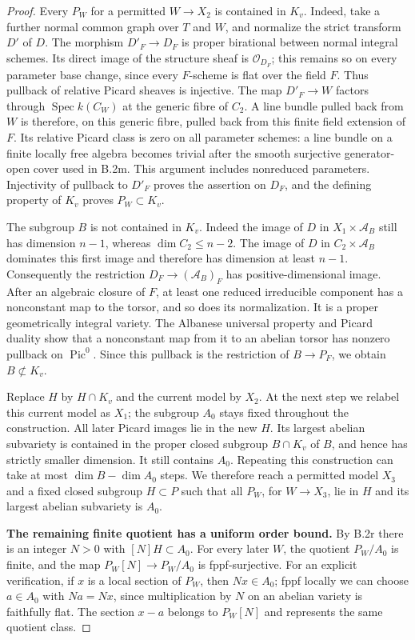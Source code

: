 \begin{proof}
Every $P_W$ for a permitted $W\to X_2$ is contained in $K_v$.
Indeed, take a further normal common graph over $T$ and $W$,
and normalize the strict transform $D'$ of $D$.  The morphism
$D'_F\to D_F$ is proper birational between normal integral
schemes.  Its direct image of the structure sheaf
is $\mathcal O_{D_F}$; this remains so on every parameter base
change, since every $F$-scheme is flat over the field $F$.
Thus pullback of relative Picard sheaves
is injective.  The map $D'_F\to W$ factors through
$\operatorname{Spec}k(C_W)$ at the generic fibre of $C_2$.
A line bundle pulled back from $W$ is therefore, on this
generic fibre, pulled back from this finite field extension of
$F$.  Its relative Picard class is zero on all parameter
schemes: a line bundle on a finite locally free algebra becomes
trivial after the smooth surjective generator-open cover used
in B.2m.  This argument includes nonreduced parameters.
Injectivity of pullback to $D'_F$ proves the assertion on $D_F$,
and the defining property of $K_v$ proves $P_W\subset K_v$.

The subgroup $B$ is not contained in $K_v$.
Indeed the image of $D$ in $X_1\times\mathcal A_B$ still has
dimension $n-1$, whereas $\dim C_2\le n-2$.
The image of $D$ in $C_2\times\mathcal A_B$ dominates this
first image and therefore has dimension at least $n-1$.
Consequently the restriction $D_F\to(\mathcal A_B)_F$ has
positive-dimensional image.  After an algebraic closure of
$F$, at least one reduced irreducible component has a
nonconstant map to the torsor, and so does its normalization.
It is a proper geometrically integral variety.  The Albanese
universal property and Picard duality show that a nonconstant
map from it to an abelian torsor has nonzero pullback on
$\operatorname{Pic}^0$.  Since this pullback is the restriction
of $B\to P_F$, we obtain $B\not\subset K_v$.

Replace $H$ by $H\cap K_v$ and the current model by $X_2$.
At the next step we relabel this current model as $X_1$;
the subgroup $A_0$ stays fixed throughout the construction.
All later Picard images lie in the new $H$.  Its largest
abelian subvariety is contained in the proper closed subgroup
$B\cap K_v$ of $B$, and hence has strictly smaller dimension.
It still contains $A_0$.  Repeating this construction can take
at most $\dim B-\dim A_0$ steps.  We therefore reach a permitted
model $X_3$ and a fixed closed subgroup $H\subset P$ such that
all $P_W$, for $W\to X_3$, lie in $H$ and its largest abelian
subvariety is $A_0$.

\par\smallskip\noindent\textbf{The remaining finite quotient has a uniform order bound.}\quad
By B.2r there is an integer $N>0$ with $[N]H\subset A_0$.
For every later $W$, the quotient $P_W/A_0$ is finite, and
the map $P_W[N]\to P_W/A_0$ is fppf-surjective.
For an explicit verification, if $x$ is a local section of
$P_W$, then $Nx\in A_0$; fppf locally we can choose
$a\in A_0$ with $Na=Nx$, since multiplication by $N$ on an
abelian variety is faithfully flat.  The section $x-a$ belongs
to $P_W[N]$ and represents the same quotient class.


\end{proof}
